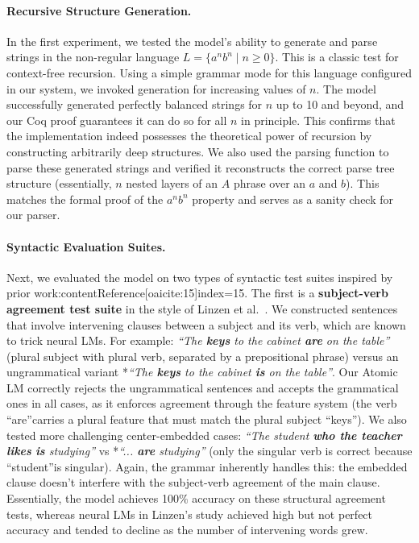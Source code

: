 \documentclass[11pt]{article}
\begin{document}
\paragraph{Recursive Structure Generation.} In the first experiment, we tested the model's ability to generate and parse strings in the non-regular language $L = \{a^n b^n \mid n \ge 0\}$. This is a classic test for context-free recursion. Using a simple grammar mode for this language configured in our system, we invoked generation for increasing values of $n$. The model successfully generated perfectly balanced strings for $n$ up to 10 and beyond, and our Coq proof guarantees it can do so for all $n$ in principle. This confirms that the implementation indeed possesses the theoretical power of recursion by constructing arbitrarily deep structures. We also used the parsing function to parse these generated strings and verified it reconstructs the correct parse tree structure (essentially, $n$ nested layers of an $A$ phrase over an $a$ and $b$). This matches the formal proof of the $a^n b^n$ property and serves as a sanity check for our parser.

\paragraph{Syntactic Evaluation Suites.} Next, we evaluated the model on two types of syntactic test suites inspired by prior work:contentReference[oaicite:15]{index=15}. The first is a \textbf{subject-verb agreement test suite} in the style of Linzen et al.~\cite{linzen2016}. We constructed sentences that involve intervening clauses between a subject and its verb, which are known to trick neural LMs. For example: \textit{\textquotedblleft The \textbf{keys} to the cabinet \textbf{are} on the table\textquotedblright} (plural subject with plural verb, separated by a prepositional phrase) versus an ungrammatical variant *\textit{\textquotedblleft The \textbf{keys} to the cabinet \textbf{is} on the table\textquotedblright}. Our Atomic LM correctly rejects the ungrammatical sentences and accepts the grammatical ones in all cases, as it enforces agreement through the feature system (the verb \textquotedblleft are\textquotedblright carries a plural feature that must match the plural subject \textquotedblleft keys\textquotedblright). We also tested more challenging center-embedded cases: \textit{\textquotedblleft The student \textbf{who the teacher likes} \textbf{is} studying\textquotedblright} vs *\textit{\textquotedblleft ... \textbf{are} studying\textquotedblright} (only the singular verb is correct because \textquotedblleft student\textquotedblright is singular). Again, the grammar inherently handles this: the embedded clause doesn't interfere with the subject-verb agreement of the main clause. Essentially, the model achieves 100\% accuracy on these structural agreement tests, whereas neural LMs in Linzen's study achieved high but not perfect accuracy and tended to decline as the number of intervening words grew.
\end{document}
